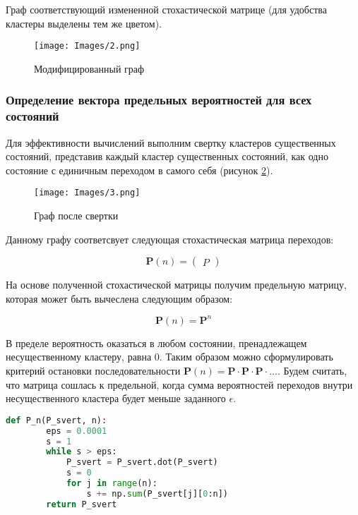 Граф соответствующий измененной стохастической матрице (для удобства кластеры выделены тем же цветом).

\begin{figure}[H]
\centerline{\texttt{[image: Images/2.png]}}
\caption{Модифицированный граф}
\label{graph}
\end{figure}


\subsubsection{Определение вектора предельных вероятностей для всех состояний}
Для эффективности вычислений выполним свертку кластеров существенных состояний, представив каждый кластер существенных состояний,
как одно состояние с единичным переходом в самого себя (рисунок \ref{sver_gr}).

\begin{figure}[H]
\centerline{\texttt{[image: Images/3.png]}}
\caption{Граф после свертки}
\label{sver_gr}
\end{figure}

Данному графу соответсвует следующая стохастическая матрица переходов:

$$
\mathbf{P}(n)=
\begin{pmatrix}
{{ P }}
\end{pmatrix}
$$

На основе полученной стохастической матрицы получим предельную матрицу, которая может быть вычеслена следующим образом:

$$
    \mathbf{P} (n) = \mathbf{P}^n
$$

В пределе вероятность оказаться в любом состоянии, пренадлежащем несущественному кластеру, равна 0.
Таким образом можно сформулировать критерий остановки последовательности $\mathbf{P} (n) = \mathbf{P} \cdot \mathbf{P} \cdot \mathbf{P} \cdot \dots$.
Будем считать, что матрица сошлась к предельной, когда сумма вероятностей переходов внутри несущественного кластера будет меньше заданного $\epsilon$.

\begin{lstlisting}[language=python, label=prog,caption={\textit{Нахождение предельной матрицы переходов}}]
    def P_n(P_svert, n):
        eps = 0.0001
        s = 1
        while s > eps:
            P_svert = P_svert.dot(P_svert)
            s = 0
            for j in range(n):
                s += np.sum(P_svert[j][0:n])
        return P_svert
\end{lstlisting}

